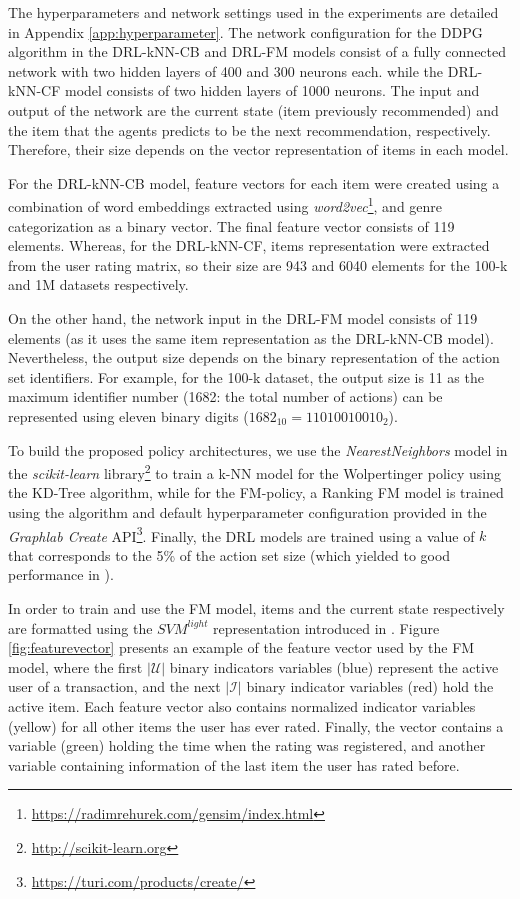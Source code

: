 The hyperparameters and network settings used in the experiments are detailed in Appendix \ref{app:hyperparameter}. The network configuration for the DDPG algorithm in the DRL-kNN-CB and DRL-FM models consist of a fully connected network with two hidden layers of 400 and 300 neurons each. while the DRL-kNN-CF model consists of two hidden layers of 1000 neurons. The input and output of the network are the current state (item previously recommended) and the item that the agents predicts to be the next recommendation, respectively. Therefore, their size depends on the vector representation of items in each model.

For the DRL-kNN-CB model, feature vectors for each item were created using a combination of word embeddings extracted using \textit{word2vec}\footnote{\url{https://radimrehurek.com/gensim/index.html}}, and genre categorization as a binary vector. The final feature vector consists of 119 elements. Whereas, for the DRL-kNN-CF, items representation were extracted from the user rating matrix, so their size are 943 and 6040 elements for the 100-k and 1M datasets respectively.

On the other hand, the network input in the DRL-FM model consists of 119 elements (as it uses the same item representation as the DRL-kNN-CB model). Nevertheless, the output size depends on the binary representation of the action set identifiers. For example, for the 100-k dataset, the output size is 11 as the maximum identifier number (1682: the total number of actions) can be represented using eleven binary digits ($1682_{10} = 11010010010_2$).

To build the proposed policy architectures, we use the \textit{NearestNeighbors} model in the \textit{scikit-learn} library\footnote{\url{http://scikit-learn.org}} to train a k-NN model for the Wolpertinger policy using the KD-Tree algorithm, while for the FM-policy, a Ranking FM model is  trained using the algorithm and default hyperparameter configuration provided in the \textit{Graphlab Create} API\footnote{\url{https://turi.com/products/create/}}. Finally, the DRL models are trained using a value of $k$ that corresponds to the 5\% of the action set size (which yielded to good performance in \cite{Dulac-Arnold2015}).

In order to train and use the FM model, items and the current state respectively are formatted using the $SVM^{light}$ representation introduced in \cite{joachims1999making}. Figure \ref{fig:featurevector} presents an example of the feature vector used by the FM model, where the first $|\mathcal{U}|$ binary indicators variables (blue) represent the active user of a transaction, and the next $|\mathcal{I}|$ binary indicator variables (red) hold the active item. Each feature vector also contains normalized indicator variables (yellow) for all other items the user has ever rated. Finally, the vector contains a variable (green) holding the time when the rating was registered, and another variable containing information of the last item the user has rated before.

